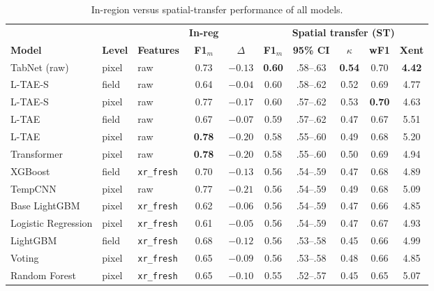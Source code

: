 \documentclass[pdflatex,sn-mathphys]{sn-jnl} %
\begin{document}
\begin{table}[htbp]
\centering
\scriptsize
\caption{In-region versus spatial-transfer performance of all models.}
\label{tab:gap}
\renewcommand{\arraystretch}{1.12}
\setlength{\tabcolsep}{2.0pt}
\begin{tabular}{lllccccccc}
\toprule
 & & & \textbf{In-reg} & & \multicolumn{5}{c}{\textbf{Spatial transfer (ST)}} \\
\cmidrule(lr){4-4}\cmidrule(lr){6-10}
\textbf{Model} & \textbf{Level} & \textbf{Features} & \textbf{F1$_m$} & \textbf{$\Delta$} & \textbf{F1$_m$} & \textbf{95\% CI} & \textbf{$\kappa$} & \textbf{wF1} & \textbf{Xent} \\
\midrule
TabNet (raw)          & pixel & raw & 0.73 & $-0.13$ & \textbf{0.60} & .58--.63 & \textbf{0.54} & 0.70 & \textbf{4.42} \\
L-TAE-S               & field & raw & 0.64 & $\mathbf{-0.04}$ & 0.60 & .58--.62 & 0.52 & 0.69 & 4.77 \\
L-TAE-S               & pixel & raw & 0.77 & $-0.17$ & 0.60 & .57--.62 & 0.53 & \textbf{0.70} & 4.63 \\
L-TAE                 & field & raw & 0.67 & $-0.07$ & 0.59 & .57--.62 & 0.47 & 0.67 & 5.51 \\
L-TAE                 & pixel & raw & \textbf{0.78} & $-0.20$ & 0.58 & .55--.60 & 0.49 & 0.68 & 5.20 \\
Transformer           & pixel & raw & \textbf{0.78} & $-0.20$ & 0.58 & .55--.60 & 0.50 & 0.69 & 4.94 \\
XGBoost               & field & \texttt{xr\_fresh} & 0.70 & $-0.13$ & 0.56 & .54--.59 & 0.47 & 0.68 & 4.89 \\
TempCNN               & pixel & raw & 0.77 & $-0.21$ & 0.56 & .54--.59 & 0.49 & 0.68 & 5.09 \\
Base LightGBM         & pixel & \texttt{xr\_fresh} & 0.62 & $-0.06$ & 0.56 & .54--.59 & 0.47 & 0.66 & 4.85 \\
Logistic Regression   & pixel & \texttt{xr\_fresh} & 0.61 & $-0.05$ & 0.56 & .54--.59 & 0.47 & 0.67 & 4.93 \\
LightGBM              & field & \texttt{xr\_fresh} & 0.68 & $-0.12$ & 0.56 & .53--.58 & 0.45 & 0.66 & 4.99 \\
Voting                & pixel & \texttt{xr\_fresh} & 0.65 & $-0.09$ & 0.56 & .53--.58 & 0.48 & 0.66 & 4.85 \\
Random Forest         & pixel & \texttt{xr\_fresh} & 0.65 & $-0.10$ & 0.55 & .52--.57 & 0.45 & 0.65 & 5.07 \\

\end{tabular}
\end{table}
\end{document}
